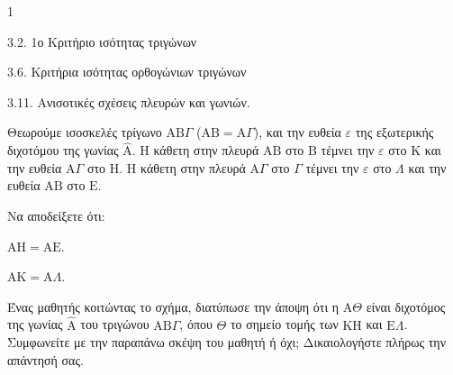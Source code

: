 \begin{ylh}{1}
    \item 3.2. 1ο Κριτήριο ισότητας τριγώνων
    \item 3.6. Κριτήρια ισότητας ορθογώνιων τριγώνων
    \item 3.11. Ανισοτικές σχέσεις πλευρών και γωνιών.
\end{ylh}
Θεωρούμε ισοσκελές τρίγωνο $\mathrm{A}\mathrm{B}\Gamma$ ($\mathrm{A}\mathrm{B}=\mathrm{A}\Gamma$), και την ευθεία $\varepsilon$ της εξωτερικής διχοτόμου της γωνίας $\hat{\mathrm{A}}$. Η κάθετη στην πλευρά $\mathrm{A}\mathrm{B}$ στο $\mathrm{B}$ τέμνει την $\varepsilon$ στο $\mathrm{K}$ και την ευθεία $\mathrm{A}\Gamma$ στο $\mathrm{H}$. Η κάθετη στην πλευρά $\mathrm{A}\Gamma$ στο $\Gamma$ τέμνει την $\varepsilon$ στο $\Lambda$ και την ευθεία $\mathrm{A}\mathrm{B}$ στο $\mathrm{E}$.
\begin{alist}
    \item Να αποδείξετε ότι:
    \begin{rlist}
        \item $\mathrm{A}\mathrm{H} = \mathrm{A}\mathrm{E}$. 
        \item $\mathrm{A}\mathrm{K} = \mathrm{A}\Lambda$. 
    \end{rlist}
    \item Ένας μαθητής κοιτώντας το σχήμα, διατύπωσε την άποψη ότι η $\mathrm{A}\Theta$ είναι διχοτόμος της γωνίας $\hat{\mathrm{A}}$ του τριγώνου $\mathrm{A}\mathrm{B}\Gamma$, όπου $\Theta$ το σημείο τομής των $\mathrm{K}\mathrm{H}$ και $\mathrm{E}\Lambda$. Συμφωνείτε με την παραπάνω σκέψη του μαθητή ή όχι; Δικαιολογήστε πλήρως την απάντησή σας. 
\end{alist}

